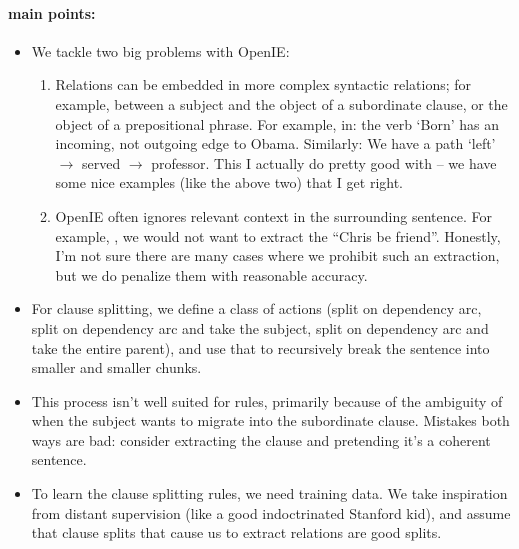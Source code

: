 \paragraph{main points:}
\begin{itemize}
  \item We tackle two big problems with OpenIE:
    \begin{enumerate}
      \item Relations can be embedded in more complex syntactic relations;
        for example, between a subject and the object of a subordinate
        clause, or the object of a prepositional phrase.
        For example, in:
        the verb `Born' has an incoming, not outgoing edge to Obama.
        Similarly:
        We have a path `left' $\rightarrow$ served $\rightarrow$ professor.
        This I actually do pretty good with -- we have some nice examples
        (like the above two) that I get right.

      \item OpenIE often ignores relevant context in the surrounding 
        sentence. For example, , we would
        not want to extract the ``Chris be friend''.
        Honestly, I'm not sure there are many cases where we prohibit such
        an extraction, but we do penalize them with reasonable accuracy.
    \end{enumerate}

  \item For clause splitting, we define a class of actions
    (split on dependency arc, split on dependency arc and take the subject,
    split on dependency arc and take the entire parent), and use that to
    recursively break the sentence into smaller and smaller chunks.
  
  \item This process isn't well suited for rules, primarily because of the
    ambiguity of when the subject wants to migrate into the subordinate
    clause. Mistakes both ways are bad: consider extracting the clause
     and pretending it's a coherent sentence.

  \item To learn the clause splitting rules, we need training data. 
    We take inspiration from distant supervision (like a good 
    indoctrinated Stanford kid), and assume that clause splits that cause
    us to extract relations are good splits.


\end{itemize}
